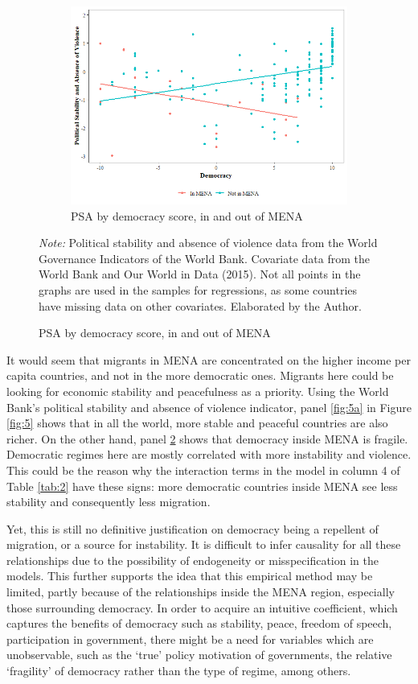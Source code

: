 \documentclass[../main.tex]{subfiles}
\begin{document}
\begin{figure}[H]
{\begin{minipage}{\textwidth}
\begin{subfigure}[b]{0.49\textwidth}
     \includegraphics[scale=0.49]{../figures/scatter/psa_dem.png}
    \caption{PSA by democracy score, in and out of MENA}
    \label{fig:5b}
    \end{subfigure}
    \textit{Note:} Political stability and absence of violence data from the World Governance Indicators of the World Bank. Covariate data from the World Bank and Our World in Data (2015). Not all points in the graphs are used in the samples for regressions, as some countries have missing data on other covariates. Elaborated by the Author.
    \end{minipage}
    }
\end{figure}

It would seem that migrants in MENA are concentrated on the higher income per capita countries, and not in the more democratic ones. Migrants here could be looking for economic stability and peacefulness as a priority. Using the World Bank’s political stability and absence of violence indicator, panel \ref{fig:5a} in Figure \ref{fig:5} shows that in all the world, more stable and peaceful countries are also richer. On the other hand, panel \ref{fig:5b} shows that democracy inside MENA is fragile. Democratic regimes here are mostly correlated with more instability and violence. This could be the reason why the interaction terms in the model in column 4 of Table \ref{tab:2} have these signs: more democratic countries inside MENA see less stability and consequently less migration.

Yet, this is still no definitive justification on democracy being a repellent of migration, or a source for instability. It is difficult to infer causality for all these relationships due to the possibility of endogeneity or misspecification in the models. This further supports the idea that this empirical method may be limited, partly because of the relationships inside the MENA region, especially those surrounding democracy. In order to acquire an intuitive coefficient, which captures the benefits of democracy such as stability, peace, freedom of speech, participation in government, there might be a need for variables which are unobservable, such as the ‘true’ policy motivation of governments, the relative ‘fragility’ of democracy rather than the type of regime, among others.
\end{document}
